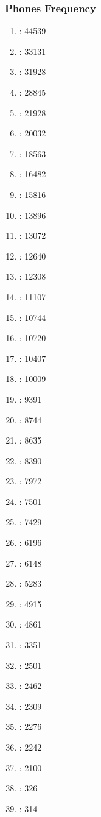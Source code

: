 \documentclass[notes]{beamer}
\begin{document}
\frame
{
  \frametitle{Phones Frequency}
\begin{multicols}{4}
\begin{enumerate}
    \item {} : 44539 
	\item {} : 33131 
	\item {} : 31928 
	\item {} : 28845 
	\item {} : 21928 
	\item {} : 20032 
	\item {} : 18563 
	\item {} : 16482 
	\item {} : 15816 
	\item {} : 13896 
	\item {} : 13072 
	\item \textipa{3\textrhoticity} : 12640 
	\item {} : 12308 
	\item {} : 11107 
	\item {} : 10744 
	\item {} : 10720 
	\item {} : 10407 
	\item {} : 10009 
	\item {} : 9391 
	\item {} : 8744 
	\item \textipa{\ae} : 8635 
	\item {} : 8390 
	\item {} : 7972 
	\item {} : 7501 
	\item {} : 7429 
	\item {} : 6196 
	\item {} : 6148 
	\item {} : 5283 
	\item {} : 4915 
	\item {} : 4861 
	\item {} : 3351 
	\item {} : 2501 
	\item {} : 2462 
	\item {} : 2309 
	\item {} : 2276 
	\item {} : 2242 
	\item {} : 2100 
	\item {} : 326 
	\item {} : 314 
\end{enumerate}
\end{multicols}
}
\end{document}
